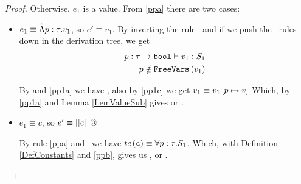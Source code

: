 \begin{proof}
Otherwise, $e_1$ is a value. From \ref{ppa} there are two cases:

\begin{itemize}
\item $e_1 \equiv \hat{\Lambda} p : \tau . v_{1}$, so $e' \equiv v_1$.
By inverting the rule \tpgen\ and if we push the \tsub\ rules down in the derivation tree,
we get 
\begin{align}
	p:\tau \rightarrow \texttt{bool} \vdash v_1 : S_1 \label{pp1a} \\
	p \notin \texttt{FreeVars}\left(v_1\right) \label{pp1c}
\end{align}

By \wsExt and \ref{pp1a} we have ,
also by \ref{pp1c} we get $v_1 \equiv v_1 \left[ p \mapsto v \right] $
Which, by \ref{pp1a} and Lemma \ref{LemValueSub} gives 
 or
.
 
\item $e_1 \equiv c$, 
so $e' \equiv {[|c|]} \ @$
			
			By rule \ref{ppa} and \tconst \ we have 
			$tc\left(\texttt{c}\right) \equiv \forall p : \tau . S_1$.
			Which, with Definition \ref{DefConstants} and \ref{ppb}, gives us 
			, or 
			. 
\end{itemize}
\end{proof}
